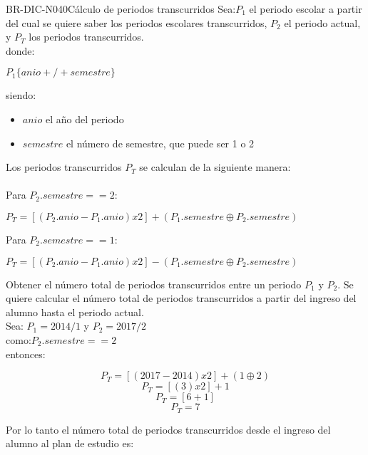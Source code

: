 \begin{BusinessRule}{BR-DIC-N040}{Cálculo de periodos transcurridos}
	\BRItem[Sentencia] \cdtEmpty
	Sea:$P_{1}$ el periodo escolar a partir del cual se quiere saber los periodos escolares transcurridos, $P_{2}$ el periodo actual, y $P_{T}$ los periodos transcurridos. \\
	donde: 
		\begin{center}
			$P_{1}\{anio + / + semestre\}$
		\end{center}
	siendo: 
		\begin{itemize}
			\item $anio$ el año del periodo 
			\item $semestre$ el número de semestre, que puede ser 1 o 2
		\end{itemize}
	Los periodos transcurridos $P_{T}$ se calculan de la siguiente manera: \\ \\
	Para $P_{2}.semestre == 2$:
		\begin{center}
			$P_{T} = [(P_{2}.anio - P_{1}.anio) x 2] + (P_{1}.semestre \oplus P_{2}.semestre)$
		\end{center}
	Para $P_{2}.semestre == 1$:
		\begin{center}
			$P_{T} = [(P_{2}.anio - P_{1}.anio) x 2] - (P_{1}.semestre \oplus P_{2}.semestre)$
		\end{center} 
	\BRItem[Motivación] Obtener el número total de periodos transcurridos entre un periodo $P_{1}$ y $P_{2}$.
	\BRItem[Ejemplo 1] \cdtEmpty
	Se quiere calcular el número total de periodos transcurridos a partir del ingreso del alumno hasta el periodo actual. \\
	Sea: $P_{1} = 2014/1$ y $P_{2} = 2017/2$ \\
	como:$P_{2}.semestre == 2$ \\  
	entonces: 
		\begin{center}
			\[P_{T} = [(2017 - 2014) x 2] + (1 \oplus 2)\]  
			\[P_{T} = [(3) x 2] + 1 \] 
			\[P_{T} = [6 + 1]\]  
			\[P_{T} = 7\]  
		\end{center}
	Por lo tanto el número total de periodos transcurridos desde el ingreso del alumno al plan de estudio es: 

\end{BusinessRule}
